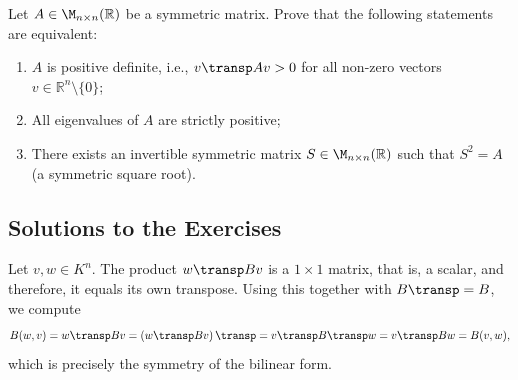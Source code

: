 \begin{exercise}
  \label{exc:positive_definite_equivalent_characterizations}
  Let $A \in \M_{n \times n}(\mathbb{R})$ be a symmetric matrix. Prove that the following statements are equivalent:
  \begin{enumerate}[label=\textbf{(\Alph*)}]
    \item $A$ is positive definite, i.e., $v\transp A v > 0$ for all non-zero vectors $v \in \mathbb{R}^n \setminus \{0\}$;
    \item All eigenvalues of $A$ are strictly positive;
    \item There exists an invertible symmetric matrix $S \in \M_{n \times n}(\mathbb{R})$ such that $S^2 = A$ (a symmetric square root).
  \end{enumerate}
\end{exercise}

\subsection{Solutions to the Exercises}
\label{sec:solutions_bilinear_quadratic}

\begin{exercisesolution}
\label{sol:symmetric_matrix_symmetric_form}
Let $v, w \in K^n$. The product $w\transp B v$ is a $1 \times 1$ matrix, that is, a scalar, and therefore, it equals its own transpose. Using this together with $B\transp = B$, we compute
\[
    B(w, v) = w\transp B v = \left(w\transp B v\right)\transp = v\transp B\transp w = v\transp B w = B(v, w),
\]
which is precisely the symmetry of the bilinear form.
\end{exercisesolution}

